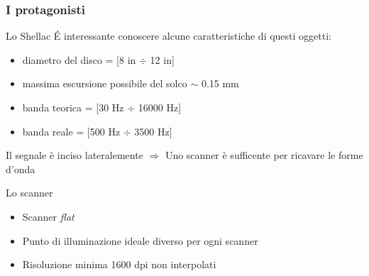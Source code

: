 \begin{frame}

\frametitle{I protagonisti}

\begin{block}{Lo Shellac}
\'E interessante conoscere alcune caratteristiche di questi oggetti:
\begin{itemize}
\item diametro del disco = [8 in $\div$ 12 in]
\item massima escursione possibile del solco $\sim$ 0.15 mm
\item banda teorica = [30 Hz $\div$ 16000 Hz]
\item banda reale = [500 Hz $\div$ 3500 Hz] 
\end{itemize}
Il segnale è inciso lateralemente $\Rightarrow$ Uno scanner è 
sufficente per ricavare le forme d'onda
\end{block}

\begin{block}{Lo scanner}
\begin{itemize}
\item Scanner \emph{flat}
\item Punto di illuminazione ideale diverso per ogni scanner
\item Risoluzione minima 1600 dpi non interpolati
\end{itemize}
\end{block}

\end{frame}


